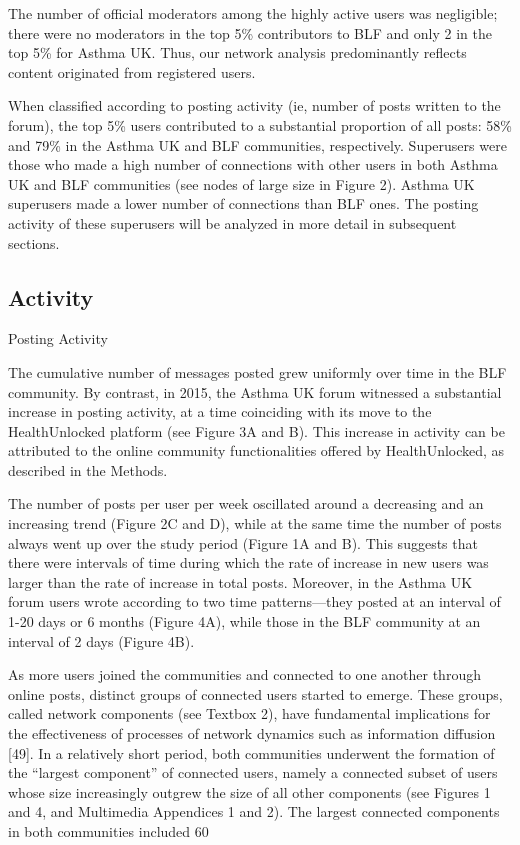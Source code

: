 The number of official moderators among the highly active users was negligible; there were no moderators in the top 5\% contributors to BLF and only 2 in the top 5\% for Asthma UK. Thus, our network analysis predominantly reflects content originated from registered users.

When classified according to posting activity (ie, number of posts written to the forum), the top 5\% users contributed to a substantial proportion of all posts: 58\% and 79\% in the Asthma UK and BLF communities, respectively. Superusers were those who made a high number of connections with other users in both Asthma UK and BLF communities (see nodes of large size in Figure 2). Asthma UK superusers made a lower number of connections than BLF ones. The posting activity of these superusers will be analyzed in more detail in subsequent sections.
\subsection{Activity}
Posting Activity

The cumulative number of messages posted grew uniformly over time in the BLF community. By contrast, in 2015, the Asthma UK forum witnessed a substantial increase in posting activity, at a time coinciding with its move to the HealthUnlocked platform (see Figure 3A and B). This increase in activity can be attributed to the online community functionalities offered by HealthUnlocked, as described in the Methods.

The number of posts per user per week oscillated around a decreasing and an increasing trend (Figure 2C and D), while at the same time the number of posts always went up over the study period (Figure 1A and B). This suggests that there were intervals of time during which the rate of increase in new users was larger than the rate of increase in total posts. Moreover, in the Asthma UK forum users wrote according to two time patterns—they posted at an interval of 1-20 days or 6 months (Figure 4A), while those in the BLF community at an interval of 2 days (Figure 4B).

As more users joined the communities and connected to one another through online posts, distinct groups of connected users started to emerge. These groups, called network components (see Textbox 2), have fundamental implications for the effectiveness of processes of network dynamics such as information diffusion [49]. In a relatively short period, both communities underwent the formation of the “largest component” of connected users, namely a connected subset of users whose size increasingly outgrew the size of all other components (see Figures 1 and 4, and Multimedia Appendices 1 and 2). The largest connected components in both communities included 60%

